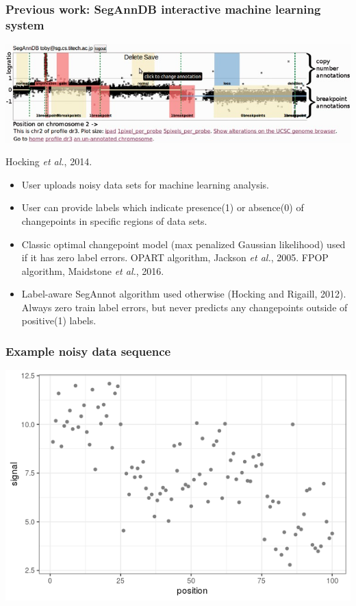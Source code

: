 \documentclass{beamer}
\begin{document}
\begin{frame}
  \frametitle{Previous work: SegAnnDB interactive machine learning
    system}

  \includegraphics[width=\textwidth]{screenshot-SegAnnDB-figure-1}

  Hocking \emph{et al.}, 2014. 

  \begin{itemize}
  \item User uploads noisy data sets for machine learning analysis.
  \item User can provide labels which indicate presence(1) or
    absence(0) of changepoints in specific regions of data sets.
  \item Classic optimal changepoint model (max penalized Gaussian
    likelihood) used if it has zero label errors. OPART algorithm,
    Jackson \emph{et al.}, 2005. FPOP algorithm, Maidstone \emph{et
      al.}, 2016. 
  \item Label-aware SegAnnot algorithm used otherwise (Hocking and
    Rigaill, 2012). Always zero train label errors, but never predicts
    any changepoints outside of positive(1) labels.
  \end{itemize}
  
\end{frame}

\begin{frame}
  \frametitle{Example noisy data sequence}

  \includegraphics[width=\textwidth]{figure-baselines-data} 
  
\end{frame}
\end{document}
